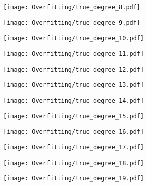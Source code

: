 \documentclass[xcolor=pdftex,dvipsnames,table]{beamer}
\begin{document}
\frame
{
	\begin{center}
		\texttt{[image: Overfitting/true\_degree\_8.pdf]}
	\end{center}
}

\frame
{
	\begin{center}
		\texttt{[image: Overfitting/true\_degree\_9.pdf]}
	\end{center}
}

\frame
{
	\begin{center}
		\texttt{[image: Overfitting/true\_degree\_10.pdf]}
	\end{center}
}

\frame
{
	\begin{center}
		\texttt{[image: Overfitting/true\_degree\_11.pdf]}
	\end{center}
}

\frame
{
	\begin{center}
		\texttt{[image: Overfitting/true\_degree\_12.pdf]}
	\end{center}
}

\frame
{
	\begin{center}
		\texttt{[image: Overfitting/true\_degree\_13.pdf]}
	\end{center}
}

\frame
{
	\begin{center}
		\texttt{[image: Overfitting/true\_degree\_14.pdf]}
	\end{center}
}

\frame
{
	\begin{center}
		\texttt{[image: Overfitting/true\_degree\_15.pdf]}
	\end{center}
}

\frame
{
	\begin{center}
		\texttt{[image: Overfitting/true\_degree\_16.pdf]}
	\end{center}
}

\frame
{
	\begin{center}
		\texttt{[image: Overfitting/true\_degree\_17.pdf]}
	\end{center}
}

\frame
{
	\begin{center}
		\texttt{[image: Overfitting/true\_degree\_18.pdf]}
	\end{center}
}

\frame
{
	\begin{center}
		\texttt{[image: Overfitting/true\_degree\_19.pdf]}
	\end{center}
}
\end{document}
